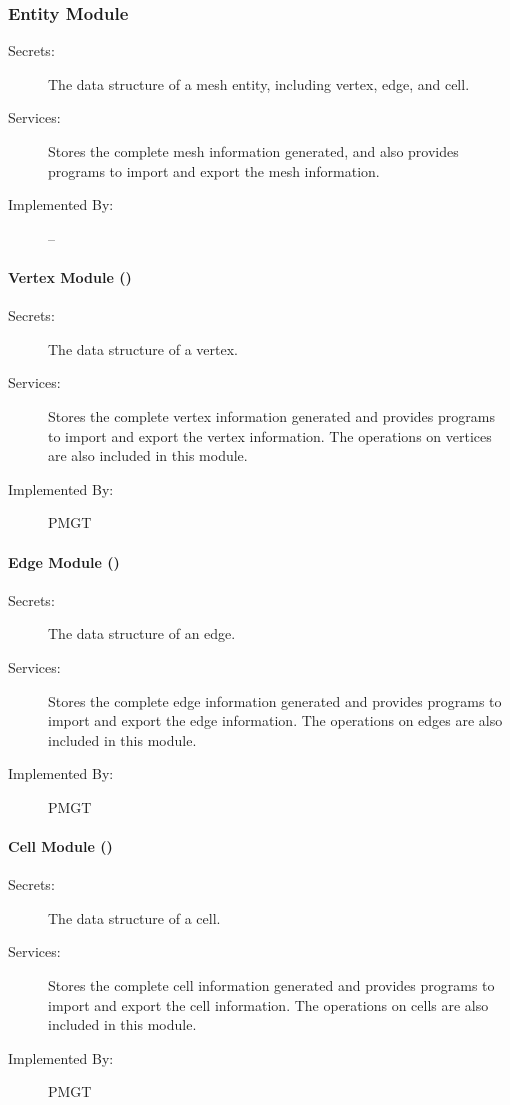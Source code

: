 \documentclass[12pt,titlepage]{article}
\begin{document}
\subsubsection{Entity Module}
\begin{description}
\item[Secrets:] The data structure of a mesh entity, including vertex, edge, and cell. 
\item[Services:] Stores the complete mesh information generated, and also provides programs to import and export the mesh information. 
\item[Implemented By:] -- 
\end{description}

\paragraph{Vertex Module ()}
\begin{description}
\item[Secrets:] The data structure of a vertex. 
\item[Services:] Stores the complete vertex information generated and provides programs to import and export the vertex information. The operations on vertices are also included in this module.
\item[Implemented By:] PMGT 
\end{description}

\paragraph{Edge Module ()}
\begin{description}
\item[Secrets:] The data structure of an edge.  
\item[Services:] Stores the complete edge information generated and provides programs to import and export the edge information. The operations on edges are also included in this module.
\item[Implemented By:] PMGT
\end{description}

\paragraph{Cell Module ()}
\begin{description}
\item[Secrets:] The data structure of a cell.
\item[Services:] Stores the complete cell information generated and provides programs to import and export the cell information. The operations on cells are also included in this module.
\item[Implemented By:] PMGT 
\end{description}
\end{document}
